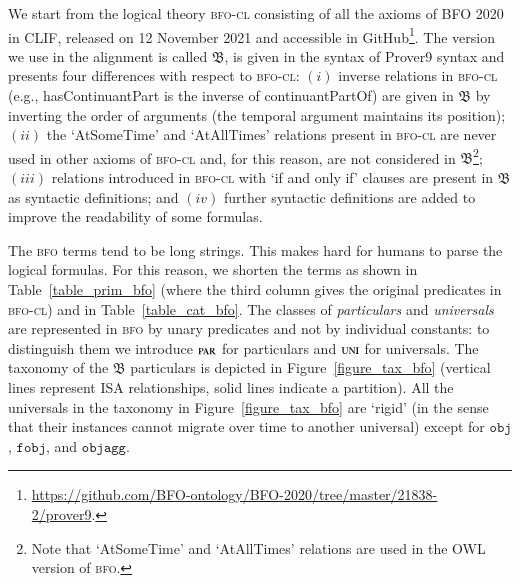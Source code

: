 \documentclass[ao]{iosart2x}
\newcommand{\nb}[1]{\textcolor{red}{$|$}\marginpar{\hspace*{-0cm}\parbox{20mm}{\scriptsize\raggedright\textcolor{red}{#1}}}}
\newcommand{\bfoDefLabel}{\textrm{d$_\texttt{b}$}}
\newcommand{\refbfodf}[1]{({\bfoDefLabel}\ref{#1})}
\newcommand{\cn}[1]{\mathtt{#1}}
\newcommand{\bfo}{{\textsc{bfo}}}
\newcommand{\bfocl}{{\textsc{bfo-cl}}}
\newcommand {\thbfo} {\ensuremath{\mathfrak{B}}}
\newcommand{\objbcat}{\cn{obj}}
\newcommand{\fobjbcat}{\cn{fobj}}
\newcommand{\objaggbcat}{\cn{objagg}}
\newcommand{\bfopartic}{\textsc{par}}
\newcommand{\bfouniv}{\textsc{uni}}
\begin{document}
We start from the logical theory {\bfocl} consisting of all the axioms of BFO 2020 in CLIF, released on 12 November 2021 and accessible in GitHub\footnote{\url{https://github.com/BFO-ontology/BFO-2020/tree/master/21838-2/prover9}.}. The version we use in the alignment is called $\thbfo$, is given in the syntax of Prover9 syntax and presents four differences with respect to {\bfocl}: $(i)$ inverse relations in {\bfocl} (e.g., hasContinuantPart is the inverse of continuantPartOf) are given in $\thbfo$ by inverting the order of arguments (the temporal argument maintains its position);  $(ii)$ the `AtSomeTime' and `AtAllTimes' relations present in {\bfocl} are never used in other axioms of {\bfocl} and, for this reason, are not considered in $\thbfo$\footnote{Note that `AtSomeTime' and `AtAllTimes' relations are used in the OWL version of {\bfo}.}; $(iii)$ relations introduced in {\bfocl} with `if and only if' clauses are present in $\thbfo$ as syntactic definitions;
and $(iv)$ further syntactic definitions are added to improve the readability of some formulas.

The {\bfo} terms tend to be long strings. This makes hard for humans to parse the logical formulas. For this reason, we shorten the terms as shown in Table~\ref{table_prim_bfo} (where the third column gives the original predicates in {\bfocl}) and in Table~\ref{table_cat_bfo}. 
The classes of \emph{particulars} and \emph{universals} are represented in {\bfo} by unary predicates and not by individual constants: to distinguish them we introduce $\bfopartic$ for particulars and $\bfouniv$ for universals. %
The taxonomy of the $\thbfo$ particulars is depicted in Figure~\ref{figure_tax_bfo} (vertical lines represent ISA relationships, solid lines indicate a partition). All the universals in the taxonomy in Figure~\ref{figure_tax_bfo} are `rigid' (in the sense that their instances cannot migrate over time to another universal) except for $\objbcat$, $\fobjbcat$, and $\objaggbcat$. %
\end{document}
